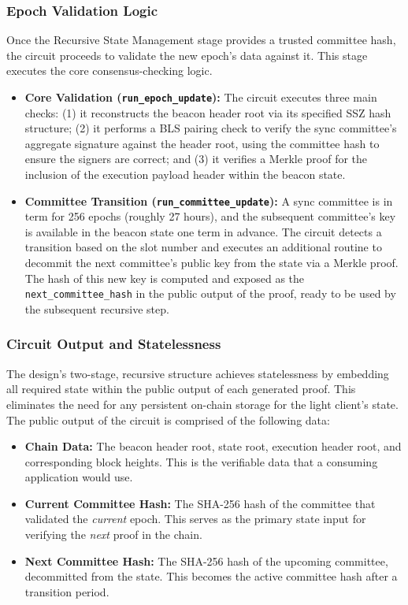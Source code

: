 \documentclass[runningheads]{llncs}
\begin{document}
\subsubsection{Epoch Validation Logic}
Once the Recursive State Management stage provides a trusted committee hash, the circuit proceeds to validate the new epoch's data against it. This stage executes the core consensus-checking logic.

\begin{itemize}
    \item \textbf{Core Validation (\texttt{run\_epoch\_update}):} The circuit executes three main checks: (1) it reconstructs the beacon header root via its specified SSZ hash structure; (2) it performs a BLS pairing check to verify the sync committee's aggregate signature against the header root, using the committee hash to ensure the signers are correct; and (3) it verifies a Merkle proof for the inclusion of the execution payload header within the beacon state.
    
    \item \textbf{Committee Transition (\texttt{run\_committee\_update}):} A sync committee is in term for 256 epochs (roughly 27 hours), and the subsequent committee's key is available in the beacon state one term in advance. The circuit detects a transition based on the slot number and executes an additional routine to decommit the next committee's public key from the state via a Merkle proof. The hash of this new key is computed and exposed as the \texttt{next\_committee\_hash} in the public output of the proof, ready to be used by the subsequent recursive step.
\end{itemize}

\subsubsection{Circuit Output and Statelessness}
The design's two-stage, recursive structure achieves statelessness by embedding all required state within the public output of each generated proof. This eliminates the need for any persistent on-chain storage for the light client's state. The public output of the circuit is comprised of the following data:

\begin{itemize}
    \item \textbf{Chain Data:} The beacon header root, state root, execution header root, and corresponding block heights. This is the verifiable data that a consuming application would use.
    \item \textbf{Current Committee Hash:} The SHA-256 hash of the committee that validated the \textit{current} epoch. This serves as the primary state input for verifying the \textit{next} proof in the chain.
    \item \textbf{Next Committee Hash:} The SHA-256 hash of the upcoming committee, decommitted from the state. This becomes the active committee hash after a transition period.
\end{itemize}
\end{document}
